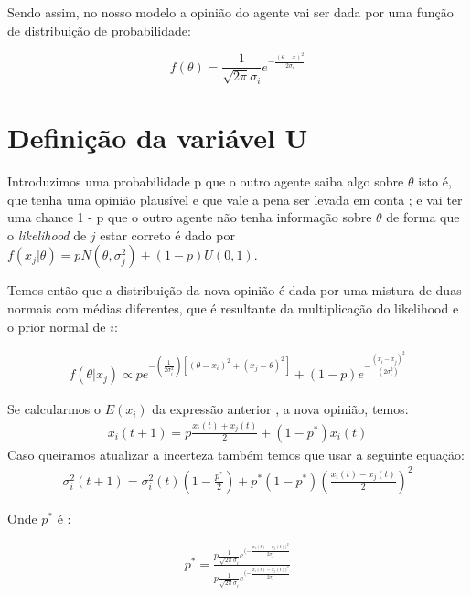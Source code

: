 Sendo assim, no nosso modelo a opinião do agente vai ser dada por uma função de
distribuição de probabilidade:

\[ f(\theta) = \frac{1}{\sqrt{2 \pi} \sigma_i} e^{-
    \frac{(\theta - x )^2}{2 \sigma_i}} \]






\section{Definição da variável U}

Introduzimos uma probabilidade p que o outro agente saiba algo sobre $\theta$ isto é,
que tenha uma opinião plausível e que vale a pena ser levada em conta ; e vai
ter uma chance 1 - p que o outro agente não tenha informação sobre $\theta$ de forma
que o \textit{likelihood} de $j$ estar correto é dado por $ f(x_j|\theta) = p
N(\theta,\sigma_j^2) + (1-p)U(0,1)$.

Temos então que a distribuição da nova opinião é dada por uma mistura
de duas normais com médias diferentes, que é resultante da
multiplicação do likelihood e o prior normal de $i$:
  
  \begin{align*}
    f(\theta | x_j)
    \propto 
    p
    e^
    {-(\frac{1}{2\sigma_i^2})
    [(\theta - x_i)^2
    +
    (x_j - \theta )^2
    ]}
    +
    (1-p)
    e^{-\frac{(x_i - x_j)^2}{(2 \sigma_i^2)}}
  \end{align*}


   Se calcularmos o $E(x_i)$ da expressão anterior , a nova opinião,
  temos:
  \begin{align*}
    x_i(t+1)
    =
    p
    \frac{x_i(t) + x_j(t)}{2}
    +
    (1-p^*)x_i(t)
  \end{align*}
  Caso queiramos atualizar a incerteza também temos que usar a
  seguinte equação:
  \begin{align*}
    \sigma_i^2(t+1)
    =
    \sigma_i^2(t)
    (1 - \frac{p^*}{2})
    +
    p^*
    (1-p^*)
    (\frac{x_i(t)-x_j(t)}{2})^2
  \end{align*}

  Onde $p^*$ é :

  \begin{align*}
    p^*
    =
    \frac{
      p \frac{1}{\sqrt{2 \pi} \sigma_i}
      e^{(- \frac{x_i (t) - x_j (t))^2}{2 \sigma_i^2}}
    }{
      p
      \frac{1}{\sqrt{2 \pi} \sigma_i}
      e^{(- \frac{x_i (t) - x_j (t))^2}{2 \sigma_i^2}}
    }
  \end{align*}

